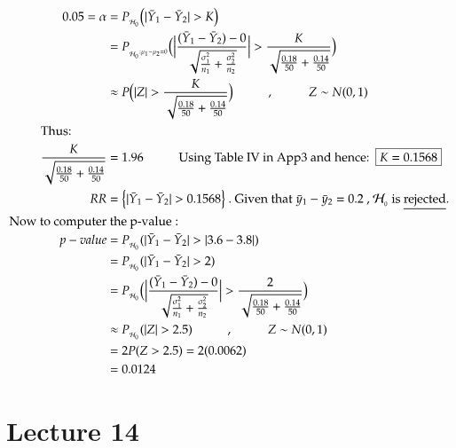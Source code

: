 \documentclass[14pt,twoside,a4paper,fleqn]{article}
\theoremstyle{plain}
\begin{document}
\begin{equation*}
\begin{split}
0.05 = \alpha &= P_{_{\mathcal{H}_0}} \big( \vert \bar{Y}_1 - \bar{Y}_2 \vert > K \big)\\
	&= P_{_{_{\mathcal{H}_0}:\mu_1 - \mu_2 = 0}} \Big( \Big| \frac{(\bar{Y}_1 - \bar{Y}_2) - 0}{\sqrt{\frac{\sigma^2_1}{n_1} + \frac{\sigma^2_2}{n_2}}} \Big| > \frac{K}{\sqrt{\frac{0.18}{50} + \frac{0.14}{50}}}\Big)\\
	&\approx P\big( |Z| > \frac{K}{\sqrt{\frac{0.18}{50}+\frac{0.14}{50}}}  \big) \hspace*{1cm} , \hspace*{1cm} Z\sim N(0,1) \\
	\text{Thus:}\hspace*{1cm} &\\
	\frac{K}{\sqrt{\frac{0.18}{50}+ \frac{0.14}{50}}} &= 1.96\hspace*{1cm}\text{Using Table IV in App3 and hence:\ } \ \boxed{K=0.1568}\\
	RR &= \big\{ |\bar{Y}_1 - \bar{Y}_2| > 0.1568 \big\}\ . \text{ Given that $\bar{y}_1 - \bar{y}_2 = 0.2$ , } \mathcal{H}_{_0} \text{ is \underline{rejected}}.\\
	\text{Now to computer} & \text{ the p-value}: \\
	p-value &= P_{_{\mathcal{H}_0}}( |\bar{Y}_1 - \bar{Y}_2  |  >   | 3.6 - 3.8   |  )\\
	&= P_{_{\mathcal{H}_0}} (|\bar{Y}_1 - \bar{Y}_2| > 2)\\
	&= P_{_{\mathcal{H}_0}} \Big(\Big|\frac{(\bar{Y}_1 - \bar{Y}_2) - 0}{\sqrt{\frac{\sigma^2_1}{n_1}+ \frac{\sigma^2_2}{n_2}}} \Big| > \frac{2}{\sqrt{\frac{0.18}{50}+\frac{0.14}{50}}} \Big) \\
	&\approx P_{_{\mathcal{H}_0}} (|Z| > 2.5) \hspace*{1cm} , \hspace*{1cm} Z\sim N(0,1)\\
	&= 2P(Z>2.5) = 2(0.0062)\\
	&= 0.0124
\end{split}
\end{equation*}

\newpage
\section{Lecture 14}
\end{document}

